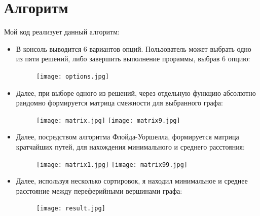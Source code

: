 \documentclass[14 pt]{article}
\begin{document}
\section{Алгоритм}
\begin{алгоритм}
Мой код реализует данный алгоритм:
\begin{itemize}
    \item В консоль выводится 6 вариантов опций. Пользователь может выбрать одно из пяти решений, либо завершить выполнение прораммы, выбрав 6 опцию:
    \begin{figure}[H]
    \texttt{[image: options.jpg]}
    \centering
    \end{figure}
    \item Далее, при выборе одного из решений, через отдельную функцию абсолютно рандомно формируется матрица смежности для выбранного графа:
    \begin{figure}[H]
    \texttt{[image: matrix.jpg]}
    \texttt{[image: matrix9.jpg]}
    \centering
    \end{figure}
    \item Далее, посредством алгоритма Флойда-Уоршелла, формируется матрица кратчайших путей, для нахождения минимального и среднего расстояния:
    \begin{figure}[H]
    \texttt{[image: matrix1.jpg]}
    \texttt{[image: matrix99.jpg]}
    \centering
    \end{figure}
    \item Далее, используя несколько сортировок, я находил минимальное и среднее расстояние между переферийными вершинами графа:
    \begin{figure}[H]
    \texttt{[image: result.jpg]}
    \centering
    \end{figure}
\end{itemize}
\end{алгоритм}
\newpage
\end{document}
